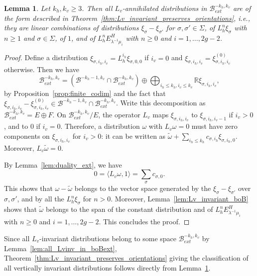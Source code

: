 \documentclass[11pt, a4paper, oneside, final, pagebackref]{amsart}
\newcommand{\boB}{\mathcal{B}}
\newcommand{\R}{\mathbb{R}}
\renewcommand{\leq}{\leqslant}
\renewcommand{\geq}{\geqslant}
\newtheorem{lem}[thm]{Lemma}
\theoremstyle{definition}
\numberwithin{equation}{section}
\begin{document}
\begin{lem}
\label{lem:Lvinv_description} Let $k_h, k_v \geq 3$. Then all
$L_v$-annihilated distributions in $\boB^{-k_h, k_v}_{ext}$ are of the form
described in Theorem~\ref{thm:Lv_invariant_preserves_orientations}, i.e.,
they are linear combinations of distributions $\xi_\sigma - \xi_{\sigma'}$
for $\sigma,\sigma'\in \Sigma$, of $L_h^n \xi_\sigma$ with $n\geq 1$ and
$\sigma\in \Sigma$, of $1$, and of $L_h^n E^H_{\lambda^{-1}\mu_i}$ with
$n\geq 0$ and $i=1,\dotsc, 2g-2$.
\end{lem}
\begin{proof}
Define a distribution $\xi_{\sigma, i_h, i_v} = L_h^{i_h} \xi_{\sigma, 0, 0}$
if $i_v = 0$ and $\xi_{\sigma, i_h, i_v} = \xi^{(0)}_{\sigma, i_h, i_v}$
otherwise. Then we have
\begin{equation*}
  \boB^{-k_h, k_v}_{ext} = (\boB^{-k_h-1, k_v} \cap \boB^{-k_h, k_v}_{ext}) \oplus \bigoplus_{i_h \leq k_h, i_v\leq k_v} \R \xi_{\sigma, i_h, i_v},
\end{equation*}
by Proposition~\ref{prop:finite_codim} and the fact that $\xi_{\sigma, i_h,
i_v} - \xi^{(0)}_{\sigma, i_h, i_v} \in \boB^{-k_h-1, k_v} \cap \boB^{-k_h,
k_v}_{ext}$. Write this decomposition as $\boB^{-k_h, k_v}_{ext}  = E \oplus
F$. On $\boB^{-k_h, k_v}_{ext} / E$, the operator $L_v$ maps $\xi_{\sigma,
i_h, i_v}$ to $\xi_{\sigma, i_h, i_v-1}$ if $i_v > 0$, and to $0$ if $i_v=0$.
Therefore, a distribution $\omega$ with $L_v \omega = 0$ must have zero
components on $\xi_{\sigma, i_h, i_v}$ for $i_v>0$: it can be written as
$\tilde \omega + \sum_{i_h \leq k_h} c_{\sigma, i_h} \xi_{\sigma, i_h, 0}$.
Moreover, $L_v \tilde \omega = 0$.

By Lemma~\ref{lem:duality_ext}, we have
\begin{equation*}
  0 = \langle L_v \omega, 1 \rangle = \sum_{\sigma} c_{\sigma, 0}.
\end{equation*}
This shows that $\omega -\tilde \omega$ belongs to the vector space generated
by the $\xi_\sigma-\xi_{\sigma'}$ over $\sigma, \sigma'$, and by all the
$L_h^n \xi_\sigma$ for $n>0$. Moreover, Lemma~\ref{lem:Lv_invariant_boB}
shows that $\tilde\omega$ belongs to the span of the constant distribution
and of $L_h^n E^H_{\lambda^{-1}\mu_i}$ with $n\geq 0$ and $i=1,\dotsc, 2g-2$.
This concludes the proof.
\end{proof}

Since all $L_v$-invariant distributions belong to some space $\boB^{-k_h,
k_v}_{ext}$ by Lemma~\ref{lem:all_Lvinv_in_boBext},
Theorem~\ref{thm:Lv_invariant_preserves_orientations} giving the
classification of all vertically invariant distributions follows directly
from Lemma~\ref{lem:Lvinv_description}.
\end{document}
